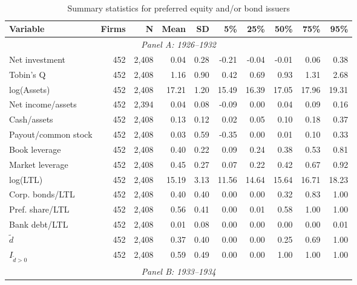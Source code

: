 \begin{table}[p]\centering
\caption{\\ Summary statistics for preferred equity and/or bond issuers}\scriptsize
\label{tab:sum_pos}
    \begin{threeparttable}
        \begin{tabular}{lrrrrrrrrr}
            \toprule
            Variable & Firms & N & Mean & SD & 5\% & 25\% & 50\% & 75\% & 95\% \\
            \midrule
            \multicolumn{10}{c}{\textit{Panel A: 1926--1932}} \\
            \midrule
            Net investment & 452 & 2,408 & 0.04 & 0.28 & -0.21 & -0.04 & -0.01 & 0.06 & 0.38 \\
            Tobin's Q & 452 & 2,408 & 1.16 & 0.90 & 0.42 & 0.69 & 0.93 & 1.31 & 2.68 \\
            log(Assets) & 452 & 2,408 & 17.21 & 1.20 & 15.49 & 16.39 & 17.05 & 17.96 & 19.31 \\
            Net income/assets & 452 & 2,394 & 0.04 & 0.08 & -0.09 & 0.00 & 0.04 & 0.09 & 0.16 \\
            Cash/assets & 452 & 2,408 & 0.13 & 0.12 & 0.02 & 0.05 & 0.10 & 0.18 & 0.37 \\
            Payout/common stock & 452 & 2,408 & 0.03 & 0.59 & -0.35 & 0.00 & 0.01 & 0.10 & 0.33 \\
            Book leverage & 452 & 2,408 & 0.40 & 0.22 & 0.09 & 0.24 & 0.38 & 0.53 & 0.81 \\
            Market leverage & 452 & 2,408 & 0.45 & 0.27 & 0.07 & 0.22 & 0.42 & 0.67 & 0.92 \\
            log(LTL) & 452 & 2,408 & 15.19 & 3.13 & 11.56 & 14.64 & 15.64 & 16.71 & 18.23 \\
            Corp. bonds/LTL & 452 & 2,408 & 0.40 & 0.40 & 0.00 & 0.00 & 0.32 & 0.83 & 1.00 \\
            Pref. share/LTL & 452 & 2,408 & 0.56 & 0.41 & 0.00 & 0.01 & 0.58 & 1.00 & 1.00 \\
            Bank debt/LTL & 452 & 2,408 & 0.01 & 0.08 & 0.00 & 0.00 & 0.00 & 0.00 & 0.01 \\
            \ensuremath{\tilde{d}} & 452 & 2,408 & 0.37 & 0.40 & 0.00 & 0.00 & 0.25 & 0.69 & 1.00 \\
            \ensuremath{I_{\tilde{d}>0}} & 452 & 2,408 & 0.59 & 0.49 & 0.00 & 0.00 & 1.00 & 1.00 & 1.00 \\
            \midrule
            \multicolumn{10}{c}{\textit{Panel B: 1933--1934}} \\

\end{tabular}
\end{threeparttable}
\end{table}
